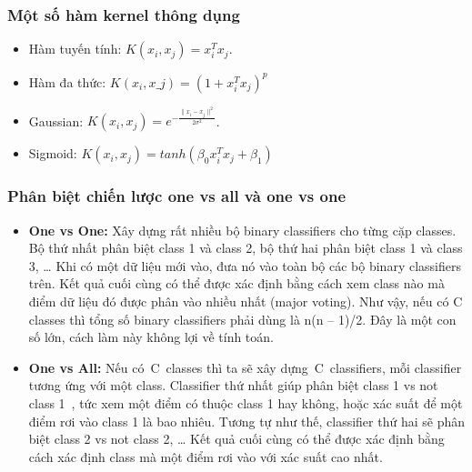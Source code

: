 \subsubsection{Một số hàm kernel thông dụng}
\begin{itemize}
    \item Hàm tuyến tính: $K(x_i, x_j) = x_i^Tx_j$.
    \item Hàm đa thức: $K(x_i, x\_j) = (1 + x_i^Tx_j)^p$
    \item Gaussian: $K(x_i, x_j) = e^{-\frac{\|x_i-x_j\|^2}{2\sigma^2}}$.
    \item Sigmoid: $K(x_i, x_j) = tanh(\beta_0x_i^Tx_j + \beta_1)$
\end{itemize}

\subsubsection{Phân biệt chiến lược one vs all và one vs one}
\begin{itemize}
    \item \textbf{One vs One: }Xây dựng rất nhiều bộ binary classifiers cho từng cặp classes. Bộ thứ nhất phân biệt class 1 và class 2, bộ thứ hai phân biệt class 1 và class 3, … Khi có một dữ liệu mới vào, đưa nó vào toàn bộ các bộ binary classifiers trên. Kết quả cuối cùng có thể được xác định bằng cách xem class nào mà điểm dữ liệu đó được phân vào nhiều nhất (major voting). Như vậy, nếu có C classes thì tổng số binary classifiers phải dùng là n(n – 1)/2. Đây là một con số lớn, cách làm này không lợi về tính toán.
    \item \textbf{One vs All: }Nếu có C classes thì ta sẽ xây dựng C classifiers, mỗi classifier tương ứng với một class. Classifier thứ nhất giúp phân biệt class 1 vs not class 1 , tức xem một điểm có thuộc class 1 hay không, hoặc xác suất để một điểm rơi vào class 1 là bao nhiêu. Tương tự như thế, classifier thứ hai sẽ phân biệt class 2 vs not class 2, … Kết quả cuối cùng có thể được xác định bằng cách xác định class mà một điểm rơi vào với xác suất cao nhất.
\end{itemize}